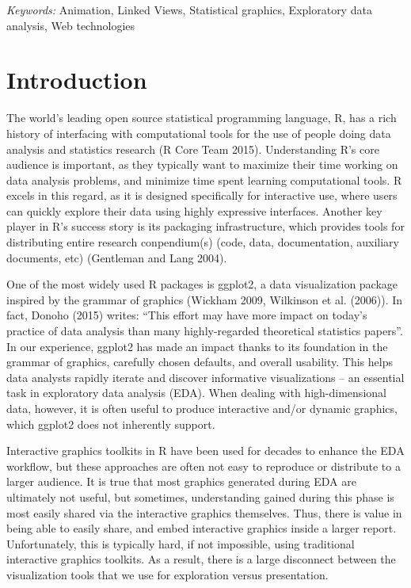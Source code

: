 \documentclass[12pt,]{article}
\theoremstyle{definition}
\theoremstyle{definition}
\theoremstyle{remark}
\begin{document}
\noindent
{\it Keywords:}  Animation, Linked Views, Statistical graphics, Exploratory data
analysis, Web technologies
\vfill

\newpage
{} %


\section{Introduction}\label{intro}

The world's leading open source statistical programming language, R, has
a rich history of interfacing with computational tools for the use of
people doing data analysis and statistics research (R Core Team 2015).
Understanding R's core audience is important, as they typically want to
maximize their time working on data analysis problems, and minimize time
spent learning computational tools. R excels in this regard, as it is
designed specifically for interactive use, where users can quickly
explore their data using highly expressive interfaces. Another key
player in R's success story is its packaging infrastructure, which
provides tools for distributing entire research conpendium(s) (code,
data, documentation, auxiliary documents, etc) (Gentleman and Lang
2004).

One of the most widely used R packages is ggplot2, a data visualization
package inspired by the grammar of graphics (Wickham 2009, Wilkinson et
al. (2006)). In fact, Donoho (2015) writes: ``This effort may have more
impact on today's practice of data analysis than many highly-regarded
theoretical statistics papers''. In our experience, ggplot2 has made an
impact thanks to its foundation in the grammar of graphics, carefully
chosen defaults, and overall usability. This helps data analysts rapidly
iterate and discover informative visualizations -- an essential task in
exploratory data analysis (EDA). When dealing with high-dimensional
data, however, it is often useful to produce interactive and/or dynamic
graphics, which ggplot2 does not inherently support.

Interactive graphics toolkits in R have been used for decades to enhance
the EDA workflow, but these approaches are often not easy to reproduce
or distribute to a larger audience. It is true that most graphics
generated during EDA are ultimately not useful, but sometimes,
understanding gained during this phase is most easily shared via the
interactive graphics themselves. Thus, there is value in being able to
easily share, and embed interactive graphics inside a larger report.
Unfortunately, this is typically hard, if not impossible, using
traditional interactive graphics toolkits. As a result, there is a large
disconnect between the visualization tools that we use for exploration
versus presentation.
\end{document}
